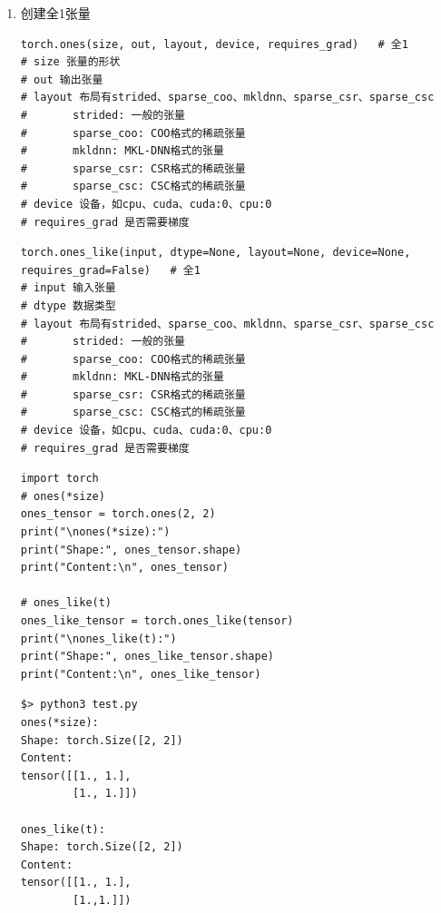 \begin{enumerate}[label=\arabic*)]
\begin{lstlisting}[style=pythonstyle]
zeros_like_tensor = torch.zeros_like(torch.tensor([2]))
print("\nzeros_like(input):")
print("Shape:", zeros_like_tensor.shape)
print("Content:\n", zeros_like_tensor)
\end{lstlisting}
\begin{lstlisting}[style=demostyle,numbers=none]
$> python3 test.py
zeros_like(input):
Shape: torch.Size([2])
Content:
tensor([0., 0.])
\end{lstlisting}      

\item 创建全1张量
\begin{lstlisting}[style=demostyle,numbers=none]
torch.ones(size, out, layout, device, requires_grad)   # 全1
# size 张量的形状
# out 输出张量
# layout 布局有strided、sparse_coo、mkldnn、sparse_csr、sparse_csc        
#       strided: 一般的张量
#       sparse_coo: COO格式的稀疏张量
#       mkldnn: MKL-DNN格式的张量
#       sparse_csr: CSR格式的稀疏张量
#       sparse_csc: CSC格式的稀疏张量
# device 设备，如cpu、cuda、cuda:0、cpu:0
# requires_grad 是否需要梯度
\end{lstlisting}
\begin{lstlisting}[style=demostyle,numbers=none]
torch.ones_like(input, dtype=None, layout=None, device=None, requires_grad=False)   # 全1
# input 输入张量
# dtype 数据类型
# layout 布局有strided、sparse_coo、mkldnn、sparse_csr、sparse_csc        
#       strided: 一般的张量
#       sparse_coo: COO格式的稀疏张量
#       mkldnn: MKL-DNN格式的张量
#       sparse_csr: CSR格式的稀疏张量
#       sparse_csc: CSC格式的稀疏张量
# device 设备，如cpu、cuda、cuda:0、cpu:0
# requires_grad 是否需要梯度
\end{lstlisting}
\begin{lstlisting}[style=pythonstyle]
import torch
# ones(*size)
ones_tensor = torch.ones(2, 2)
print("\nones(*size):")
print("Shape:", ones_tensor.shape)
print("Content:\n", ones_tensor)

# ones_like(t)
ones_like_tensor = torch.ones_like(tensor)
print("\nones_like(t):")
print("Shape:", ones_like_tensor.shape)
print("Content:\n", ones_like_tensor)
\end{lstlisting}
\begin{lstlisting}[style=demostyle,numbers=none]
$> python3 test.py
ones(*size):
Shape: torch.Size([2, 2])
Content:
tensor([[1., 1.],
        [1., 1.]])

ones_like(t):
Shape: torch.Size([2, 2])
Content:
tensor([[1., 1.],
        [1.,1.]])
\end{lstlisting}


\end{enumerate}
